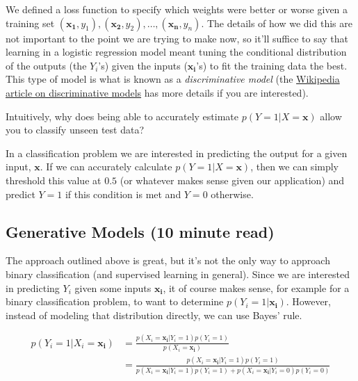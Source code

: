 \documentclass[assignment03_Solutions]{subfiles}
\begin{document}
We defined a loss function to specify which weights were better or worse given a training set $(\mathbf{x_1}, y_1), (\mathbf{x_2}, y_2), \ldots, (\mathbf{x_n}, y_n)$.  The details of how we did this are not important to the point we are trying to make now, so it'll suffice to say that learning in a logistic regression model meant tuning the conditional distribution of the outputs (the $Y_i$'s) given the inputs ($\mathbf{x_i}$'s) to fit the training data the best.  This type of model is what is known as a \emph{discriminative model} (the \href{https://en.wikipedia.org/wiki/Discriminative_model}{Wikipedia article on discriminative models} has more details if you are interested).

\vspace{1em}

\begin{understandingcheck}
Intuitively, why does being able to accurately estimate $p(Y = 1 | X = \mathbf{x})$ allow you to classify unseen test data?

\begin{boxedsolution}
In a classification problem we are interested in predicting the output for a given input, $\mathbf{x}$.  If we can accurately calculate $p(Y=1|X = \mathbf{x})$, then we can simply threshold this value at $0.5$ (or whatever makes sense given our application) and predict $Y = 1$ if this condition is met and $Y = 0$ otherwise.
\end{boxedsolution}
\end{understandingcheck}

\subsection{Generative Models (10 minute read)}
The approach outlined above is great, but it's not the only way to approach binary classification (and supervised learning in general).  Since we are interested in predicting $Y_i$ given some inputs $\mathbf{x_i}$, it of course makes sense, for example for a binary classification problem, to want to determine $p(Y_i = 1 | \mathbf{x_i})$.  However, instead of modeling that distribution directly, we can use Bayes' rule.

\begin{align}
p(Y_i  = 1 | X_i = \mathbf{x_i}) &= \frac{p(X_i = \mathbf{x_i} | Y_i = 1) p(Y_i = 1)}{p(X_i = \mathbf{x_i})} \label{eq:pgm} \\
&= \frac{p(X_i = \mathbf{x_i} | Y_i = 1) p(Y_i = 1)}{p(X_i =  \mathbf{x_i} | Y_i = 1) p(Y_i = 1) + p(X_i = \mathbf{x_i} | Y_i = 0) p(Y_i = 0)} \nonumber
\end{align}
\end{document}
